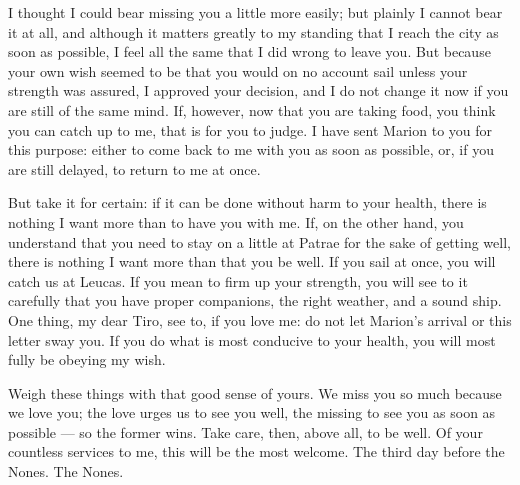 

 I thought I could bear missing you a little more easily; but plainly I cannot bear it at all, and although it matters greatly to my standing that I reach the city as soon as possible, I feel all the same that I did wrong to leave you. But because your own wish seemed to be that you would on no account sail unless your strength was assured, I approved your decision, and I do not change it now if you are still of the same mind. If, however, now that you are taking food, you think you can catch up to me, that is for you to judge. I have sent Marion to you for this purpose: either to come back to me with you as soon as possible, or, if you are still delayed, to return to me at once.

 But take it for certain: if it can be done without harm to your health, there is nothing I want more than to have you with me. If, on the other hand, you understand that you need to stay on a little at Patrae for the sake of getting well, there is nothing I want more than that you be well. If you sail at once, you will catch us at Leucas. If you mean to firm up your strength, you will see to it carefully that you have proper companions, the right weather, and a sound ship. One thing, my dear Tiro, see to, if you love me: do not let Marion's arrival or this letter sway you. If you do what is most conducive to your health, you will most fully be obeying my wish.

 Weigh these things with that good sense of yours. We miss you so much because we love you; the love urges us to see you well, the missing to see you as soon as possible --- so the former wins. Take care, then, above all, to be well. Of your countless services to me, this will be the most welcome. The third day before the Nones. The Nones.
